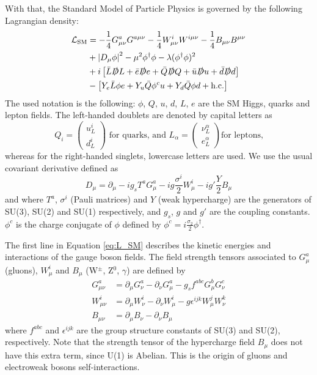 With that, the Standard Model of Particle Physics is governed by the following Lagrangian density:
\begin{equation}
\begin{aligned}
    \mathcal{L}_{\text{SM}} &= -\frac{1}{4}G_{\mu\nu}^{a}G^{a\mu\nu} -\frac{1}{4}W_{\mu\nu}^{i}W^{i\mu\nu} -\frac{1}{4}B_{\mu\nu}B^{\mu\nu} \label{eq:L_SM}\\
    &+ \left\lvert D_\mu\phi\right\rvert^2 - \mu^2\phi^\dag\phi - \lambda(\phi^\dag\phi)^2 \\
    &+ i\left[\bar{L}\slashed{D} L + \bar{e}\slashed{D} e + \bar{Q}\slashed{D} Q + \bar{u}\slashed{D} u + \bar{d}\slashed{D} d\right] \\
    & -\left[Y_{e}\bar{L}\phi e + Y_u\bar{Q}\phi^{c} u + Y_d\bar{Q}\phi d + \text{h.c.}\right]
\end{aligned}
\end{equation}
The used notation is the following: $\phi$, $Q$, $u$, $d$, $L$, $e$ are the SM Higgs, quarks and lepton fields. The left-handed doublets are denoted by capital letters as
\begin{equation*}
    Q_{i} = 
    \begin{pmatrix}
    u_{L}^{i}\\
    d_{L}^{i}
    \end{pmatrix}
    \text{ for quarks, and } L_{\alpha} = 
    \begin{pmatrix}
    \nu_{L}^{\alpha}\\
    e_{L}^{\alpha}
    \end{pmatrix}\text{for leptons,}
\end{equation*}
whereas for the right-handed singlets, lowercase letters are used. We use the usual covariant derivative defined as
\begin{equation*}
    D_\mu = \partial_\mu - ig_{s}T^{a}G_\mu^{a} - ig\frac{\sigma^{i}}{2}W_\mu^{i} - ig'\frac{Y}{2}B_\mu
\end{equation*}
and where $T^{a}$, $\sigma^{i}$ (Pauli matrices) and $Y$ (weak hypercharge) are the generators of SU(3), SU(2) and SU(1) respectively, and $g_s$, $g$ and $g'$ are the coupling constants. $\phi^{c}$ is the charge conjugate of $\phi$ defined by $\phi^{c} = i\frac{\sigma_{2}}{2}\phi^{\dag}$.

The first line in Equation \eqref{eq:L_SM} describes the kinetic energies and interactions of the gauge boson fields. The field strength tensors associated to $G_\mu^{a}$ (gluons), $W_\mu^{i}$ and $B_\mu$ (W$^{\pm}$, Z$^{0}$, $\gamma$) are defined by
\begin{align*}
    G_{\mu\nu}^{a} &= \partial_\mu G_\nu^{a} - \partial_\nu G_\mu^{a} - g_{s} f^{abc}G_\mu^{b}G_\nu^{c}\\
    W_{\mu\nu}^{i} &= \partial_\mu W_\nu^{i} - \partial_\nu W_\mu^{i} - g \epsilon^{ijk}W_\mu^{j}W_\nu^{k}\\
    B_{\mu\nu} &= \partial_\mu B_\nu - \partial_\nu B_\mu
\end{align*}
where $f^{abc}$ and $\epsilon^{ijk}$ are the group structure constants of SU(3) and SU(2), respectively. Note that the strength tensor of the hypercharge field $B_\mu$ does not have this extra term, since U(1) is Abelian. This is the origin of gluons and electroweak bosons self-interactions.

